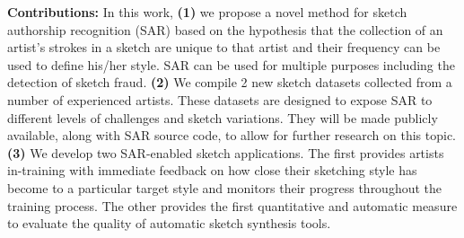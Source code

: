 \vspace{-1mm}
\textbf{Contributions:} In this work, \textbf{(1)} we propose a novel method for sketch authorship recognition (SAR) based on the hypothesis that the collection of an artist's strokes in a sketch are unique to that artist and their frequency can be used to define his/her style. SAR can be used for multiple purposes including the detection of sketch fraud. \textbf{(2)} We compile 2 new sketch datasets collected from a number of experienced artists. These datasets are designed to expose SAR to different levels of challenges and sketch variations. They will be made publicly available, along with SAR source code, to allow for further research on this topic. \textbf{(3)} We develop two SAR-enabled sketch applications. The first provides artists in-training with immediate feedback on how close their sketching style has become to a particular target style and monitors their progress throughout the training process. The other provides the first quantitative and automatic measure to evaluate the quality of automatic sketch synthesis tools.




